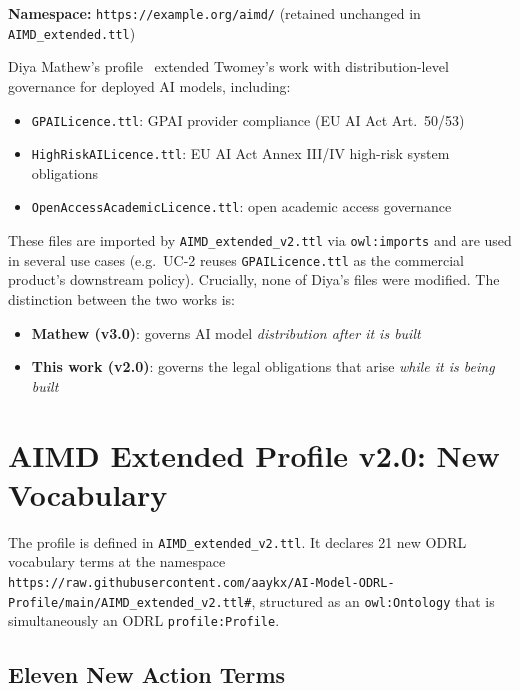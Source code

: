 \documentclass[12pt,a4paper]{article}
\begin{document}
\textbf{Namespace:} \texttt{https://example.org/aimd/} (retained unchanged in \texttt{AIMD\_extended.ttl})

Diya Mathew's profile~\cite{mathew2026} extended Twomey's work with distribution-level governance for deployed AI models, including:

\begin{itemize}[noitemsep]
  \item \texttt{GPAILicence.ttl}: GPAI provider compliance (EU AI Act Art.\ 50/53)
  \item \texttt{HighRiskAILicence.ttl}: EU AI Act Annex III/IV high-risk system obligations
  \item \texttt{OpenAccessAcademicLicence.ttl}: open academic access governance
\end{itemize}

These files are imported by \texttt{AIMD\_extended\_v2.ttl} via \texttt{owl:imports} and are used in several use cases (e.g.\ UC-2 reuses \texttt{GPAILicence.ttl} as the commercial product's downstream policy). Crucially, none of Diya's files were modified. The distinction between the two works is:

\begin{itemize}[noitemsep]
  \item \textbf{Mathew (v3.0)}: governs AI model \emph{distribution after it is built}
  \item \textbf{This work (v2.0)}: governs the legal obligations that arise \emph{while it is being built}
\end{itemize}

\newpage

\section{AIMD Extended Profile v2.0: New Vocabulary}

The profile is defined in \texttt{AIMD\_extended\_v2.ttl}. It declares 21 new ODRL vocabulary terms at the namespace \texttt{https://raw.githubusercontent.com/aaykx/AI-Model-ODRL-Profile/main/AIMD_extended_v2.ttl#}, structured as an \texttt{owl:Ontology} that is simultaneously an ODRL \texttt{profile:Profile}.

\subsection{Eleven New Action Terms}
\end{document}
